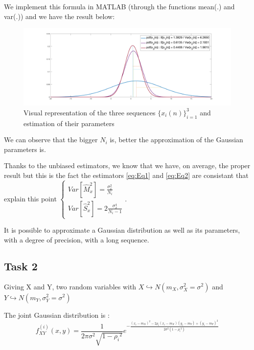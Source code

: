 \documentclass[onecolumn, 12pt]{IEEEtran}
\begin{document}
We implement this formula in MATLAB (through the functions mean(.) and var(.)) and we have the result below:

\begin{multicols}{2}
\begin{figure}[H]
	\centering
	\includegraphics[scale = 0.1]{Task1}
	\caption{Visual representation of the three sequences $\{x_i(n)\}_{i=1}^3$ and estimation of their parameters}
\label{fig:Fig1}
\end{figure}
We can observe that the bigger $N_i$ is, better the approximation of the Gaussian parameters is. 

Thanks to the unbiased estimators, we know that we have, on average, the proper result but this is the fact the estimators \eqref{eq:Eq1} and \eqref{eq:Eq2} are consistant that explain this point $\begin{cases}Var[\hat{M}_{x}^2]= \frac{\sigma_x^2}{N_i} \\Var[\hat{S}_{x}^2]= 2\frac{\sigma_x^4}{N_i-1} \end{cases}$.
\end{multicols}


It is possible to approximate a Gaussian distribution as well as its parameters, with a degree of precision, with a long sequence.

\subsection*{Task 2}


Giving X and Y, two random variables with $X \hookrightarrow N(m_X, \sigma_X^2 = \sigma^2) $ and $Y \hookrightarrow N(m_Y, \sigma_Y^2= \sigma^2) $
\newline

The joint Gaussian distribution is :
\begin{equation} \label{eq:Eq5}
f_{XY}^{(i)}(x,y) = \frac { 1 }{ 2\pi \sigma^2 \sqrt { 1-{ \rho_i  }^{ 2 } }  } { e }^{ -\frac { { (x_i - m_X) }^{ 2 }-2\rho_i (x_i - m_X)(y_i-m_Y)+{ (y_i - m_Y) }^{ 2 } }{ 2 \sigma^2 (1-{ \rho_i  }^{ 2 }) }  }
\end{equation}
\newline
\end{document}
